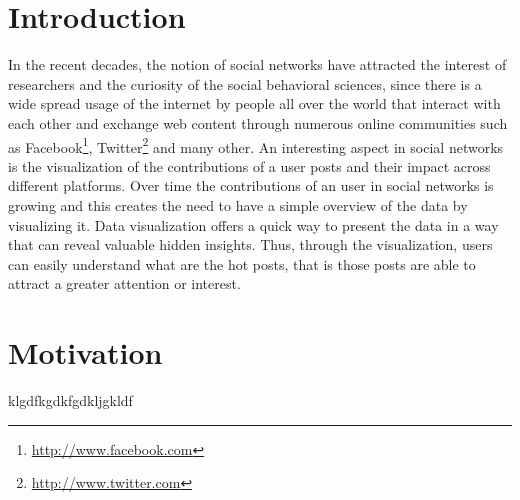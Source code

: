 \section{Introduction}


In the recent decades, the notion of social networks have attracted the interest of researchers and the curiosity of the social behavioral sciences, since there is a wide spread usage of the internet by people all over the world that interact with each other and exchange web content through numerous online communities such as Facebook\footnote{\url{http://www.facebook.com}}, Twitter\footnote{\url{http://www.twitter.com}} and many other.
An interesting aspect in social networks is the visualization of the contributions of a user posts and their impact across different platforms. Over time the contributions of an user in social networks is growing and this creates the need to have a simple overview of the data by visualizing it. Data visualization offers a quick way to present the data in a way that can reveal valuable hidden insights. Thus, through the visualization, users can easily understand what are the hot posts, that is those posts are able to attract a greater attention or interest.





\section{Motivation}
klgdfkgdkfgdkljgkldf


